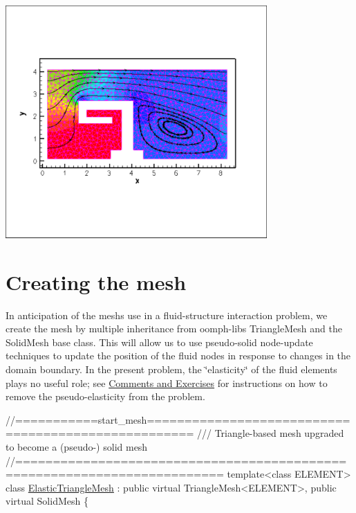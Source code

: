  
\begin{DoxyImage}
\includegraphics[width=0.75\textwidth]{stream}
\end{DoxyImage}




 

\hypertarget{index_mesh_code}{}\section{Creating the mesh}\label{index_mesh_code}
In anticipation of the mesh\textquotesingle{}s use in a fluid-\/structure interaction problem, we create the mesh by multiple inheritance from {\ttfamily oomph-\/lib\textquotesingle{}s} {\ttfamily Triangle\+Mesh} and the {\ttfamily Solid\+Mesh} base class. This will allow us to use pseudo-\/solid node-\/update techniques to update the position of the fluid nodes in response to changes in the domain boundary. In the present problem, the \char`\"{}elasticity\char`\"{} of the fluid elements plays no useful role; see \hyperlink{index_comm_ex}{Comments and Exercises} for instructions on how to remove the pseudo-\/elasticity from the problem.

 
\begin{DoxyCodeInclude}
\textcolor{comment}{//===========start\_mesh====================================================}
\textcolor{comment}{/// Triangle-based mesh upgraded to become a (pseudo-) solid mesh}
\textcolor{comment}{}\textcolor{comment}{//=========================================================================}
\textcolor{keyword}{template}<\textcolor{keyword}{class} ELEMENT>
\textcolor{keyword}{class }\hyperlink{classElasticTriangleMesh}{ElasticTriangleMesh} : \textcolor{keyword}{public} \textcolor{keyword}{virtual} TriangleMesh<ELEMENT>,
                            \textcolor{keyword}{public} \textcolor{keyword}{virtual} SolidMesh 
\{

\end{DoxyCodeInclude}


